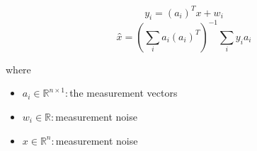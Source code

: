 \documentclass[12pt]{article}
\begin{document}
\[
\textit{y}_{ \textit{i} } = (\textit{a}_{ \textit{i} })^T\textit{x} + \textit{w}_{ \textit{i} }
\]
\[
\textit{x̂} = (\sum_\textit{i} \textit{a}_{ \textit{i} }(\textit{a}_{ \textit{i} })^T)^{-1}\sum_\textit{i} \textit{y}_{ \textit{i} }\textit{a}_{ \textit{i} }
\]

where
\begin{itemize}
\item $\textit{a}_{\textit{i}} \in \mathbb{R}^{ \textit{n} \times 1 }:$the measurement vectors  
\item $\textit{w}_{\textit{i}} \in \mathbb{{R}}:$measurement noise 
\item $\textit{x} \in \mathbb{R}^{ \textit{n}}:$measurement noise 
\end{itemize}
\end{document}
